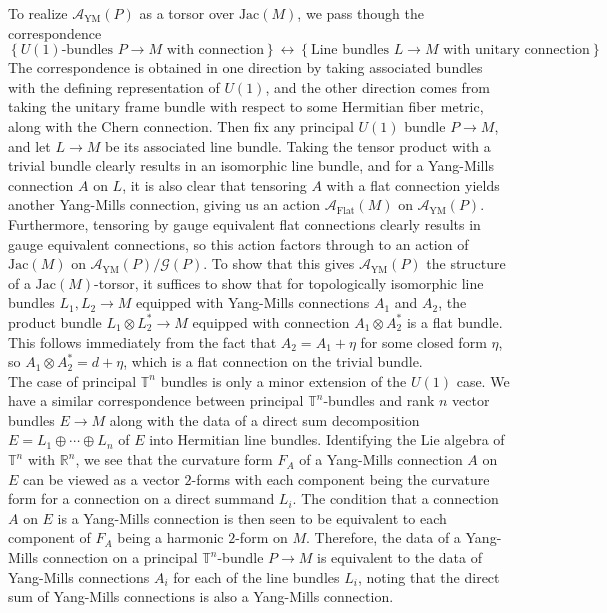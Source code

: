 \documentclass[psamsfonts, 12pt]{amsart}
\theoremstyle{definition}
\theoremstyle{remark}
\newcommand{\R}{\mathbb{R}}
\newcommand{\set}[1]{\left\lbrace #1 \right\rbrace}
\begin{document}
To realize $\mathscr{A}_{\text{YM}}(P)$ as a torsor over $\mathrm{Jac}(M)$, we
pass though the correspondence
\[
\set{U(1)\text{-bundles } P \to M \text{ with connection}}
\leftrightarrow \set{\text{Line bundles } L \to M \text{ with unitary connection}}
\]
The correspondence is obtained in one direction by taking associated bundles with the
defining representation of $U(1)$, and the other direction comes from taking
the unitary frame bundle with respect to some Hermitian fiber metric, along with
the Chern connection. Then fix any principal $U(1)$ bundle $P \to M$, and let
$L \to M$ be its associated line bundle. Taking the tensor product with a trivial
bundle clearly results in an isomorphic line bundle, and for a Yang-Mills
connection $A$ on $L$, it is also clear that tensoring $A$ with a flat connection
yields another Yang-Mills connection, giving us an action $\mathscr{A}_{\text{Flat}}(M)$
on $\mathscr{A}_{\text{YM}}(P)$. Furthermore, tensoring by gauge equivalent flat
connections clearly results in gauge equivalent connections, so this action factors
through to an action of $\mathrm{Jac}(M)$ on $\mathscr{A}_{\text{YM}}(P)/\mathscr{G}(P)$.
To show that this gives $\mathscr{A}_{\text{YM}}(P)$ the structure of a
$\mathrm{Jac}(M)$-torsor, it suffices to show that for topologically isomorphic line
bundles $L_1,L_2 \to M$ equipped with Yang-Mills connections $A_1$ and $A_2$,
the product bundle $L_1 \otimes L_2^* \to M$ equipped with connection $A_1 \otimes A_2^*$
is a flat bundle. This follows immediately from the fact that $A_2 = A_1 + \eta$
for some closed form $\eta$, so $A_1 \otimes A_2^* = d + \eta$, which is a flat
connection on the trivial bundle. \\

The case of principal $\mathbb{T}^n$ bundles is only a minor extension of
the $U(1)$ case. We have a similar correspondence between principal
$\mathbb{T}^n$-bundles and rank $n$ vector bundles $E \to M$ along with the
data of a direct sum decomposition $E = L_1 \oplus \cdots \oplus L_n$ of
$E$ into Hermitian line bundles. Identifying the Lie algebra of
$\mathbb{T}^n$ with $\R^n$, we see that the curvature form $F_A$ of a Yang-Mills
connection $A$ on $E$ can be viewed as a vector $2$-forms with each component being the
curvature form for a connection on a direct summand $L_i$. The condition that a
connection $A$ on $E$ is a Yang-Mills connection is then seen to be equivalent to each
component of $F_A$ being a harmonic $2$-form on $M$. Therefore, the data of a Yang-Mills
connection on a principal $\mathbb{T}^n$-bundle $P \to M$ is equivalent to the data of
Yang-Mills connections $A_i$ for each of the line bundles $L_i$, noting that the direct
sum of Yang-Mills connections is also a Yang-Mills connection.
%
\end{document}
